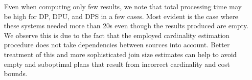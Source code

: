 Even when computing only few results, we note that total processing
time may be high for DP, DPU, and DPS in a few cases. Most evident is
the case where these systems needed more than 20s even though the
results produced are empty. We observe this is due to the fact that
the employed cardinality estimation procedure does not take
dependencies between sources into account. Better treatment of this
and more sophisticated join size estimates
\cite{spiegel_graph-based_2006} can help to avoid empty and suboptimal
plans that result from incorrect cardinality and cost bounds.



















